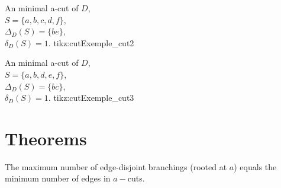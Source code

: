\documentclass{article}
\begin{document}
{An minimal a-cut of $D$,\\ $S = \{a, b, c, d, f\}$,\\ $\Delta_D(S)=\{be\}$,\\ $\delta_D(S) = 1$.}
{tikz:cutExemple_cut2}

{An minimal a-cut of $D$,\\ $S = \{a, b, d, e, f\}$,\\ $\Delta_D(S)=\{bc\}$,\\ $\delta_D(S) = 1$.}
{tikz:cutExemple_cut3}

\section{Theorems}

\begin{edmonds_theorem}[Edmonds]
The maximum number of edge-disjoint branchings (rooted at $a$) 
equals the minimum number of edges in $a-$cuts.
\end{edmonds_theorem}
\end{document}
